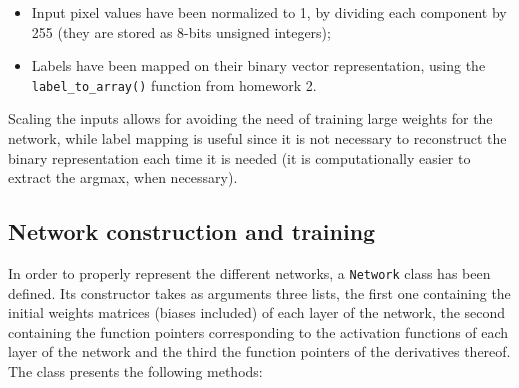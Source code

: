 \documentclass[letterpaper,headings=standardclasses]{scrartcl}
\begin{document}
\begin{itemize}

    \item Input pixel values have been normalized to 1, by dividing each component by 255 (they are stored as 8-bits unsigned integers);
    
    \item Labels have been mapped on their binary vector representation, using the \texttt{label\_to\_array()} function from homework 2.

\end{itemize}

Scaling the inputs allows for avoiding the need of training large weights for the network, while label mapping is useful since it is not necessary to reconstruct the binary representation each time it is needed (it is computationally easier to extract the argmax, when necessary).

\subsection{Network construction and training}

In order to properly represent the different networks, a \texttt{Network} class has been defined. Its constructor takes as arguments three lists, the first one containing the initial weights matrices (biases included) of each layer of the network, the second containing the function pointers corresponding to the activation functions of each layer of the network and the third the function pointers of the derivatives thereof. The class presents the following methods:
\end{document}
